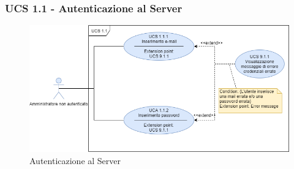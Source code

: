 \subsubsection{UCS 1.1 - Autenticazione al Server}

\begin{figure}[h]
    \centering
    \includegraphics[scale=0.6]{sezioni/UseCase/Immagini/UCS1.1.png}
    \caption{Autenticazione al Server}
\end{figure}

